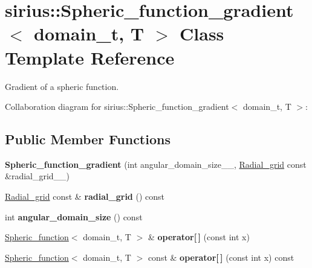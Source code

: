 \hypertarget{classsirius_1_1_spheric__function__gradient}{}\section{sirius\+:\+:Spheric\+\_\+function\+\_\+gradient$<$ domain\+\_\+t, T $>$ Class Template Reference}
\label{classsirius_1_1_spheric__function__gradient}


Gradient of a spheric function.  




Collaboration diagram for sirius\+:\+:Spheric\+\_\+function\+\_\+gradient$<$ domain\+\_\+t, T $>$\+:
\subsection*{Public Member Functions}
\begin{DoxyCompactItemize}
\item 
\hypertarget{classsirius_1_1_spheric__function__gradient_a5a9c540605a67a5082422e1d5b100245}{}{\bfseries Spheric\+\_\+function\+\_\+gradient} (int angular\+\_\+domain\+\_\+size\+\_\+\+\_\+, \hyperlink{classsirius_1_1_radial__grid}{Radial\+\_\+grid} const \&radial\+\_\+grid\+\_\+\+\_\+)\label{classsirius_1_1_spheric__function__gradient_a5a9c540605a67a5082422e1d5b100245}

\item 
\hypertarget{classsirius_1_1_spheric__function__gradient_a8d94b0c829b41b2a010d32f13999e2c2}{}\hyperlink{classsirius_1_1_radial__grid}{Radial\+\_\+grid} const \& {\bfseries radial\+\_\+grid} () const \label{classsirius_1_1_spheric__function__gradient_a8d94b0c829b41b2a010d32f13999e2c2}

\item 
\hypertarget{classsirius_1_1_spheric__function__gradient_adc5c2bc6bafd6f8a3286ba9247fe0b4a}{}int {\bfseries angular\+\_\+domain\+\_\+size} () const \label{classsirius_1_1_spheric__function__gradient_adc5c2bc6bafd6f8a3286ba9247fe0b4a}

\item 
\hypertarget{classsirius_1_1_spheric__function__gradient_a2a290a370b3efa6c7a9dbd413e43b6d0}{}\hyperlink{classsirius_1_1_spheric__function}{Spheric\+\_\+function}$<$ domain\+\_\+t, T $>$ \& {\bfseries operator\mbox{[}$\,$\mbox{]}} (const int x)\label{classsirius_1_1_spheric__function__gradient_a2a290a370b3efa6c7a9dbd413e43b6d0}

\item 
\hypertarget{classsirius_1_1_spheric__function__gradient_a72eb44c6ace5d5f8be2752c9dbae0c47}{}\hyperlink{classsirius_1_1_spheric__function}{Spheric\+\_\+function}$<$ domain\+\_\+t, T $>$ const \& {\bfseries operator\mbox{[}$\,$\mbox{]}} (const int x) const \label{classsirius_1_1_spheric__function__gradient_a72eb44c6ace5d5f8be2752c9dbae0c47}

\end{DoxyCompactItemize}
